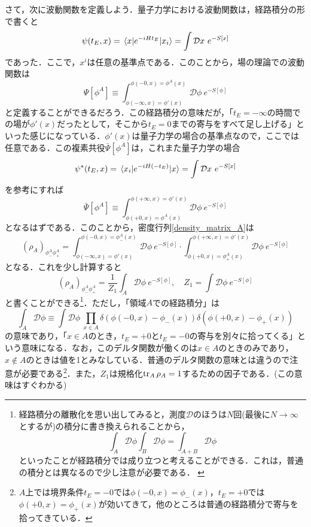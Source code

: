 \documentclass[a4paper,uplatex,dvipdfmx]{jsarticle}
\theoremstyle{definition}
\begin{document}
さて，次に波動関数を定義しよう．量子力学における波動関数は，経路積分の形で書くと
\begin{equation}
  \psi(t_{E},x)
  =
  \ev*{x|e^{-iHt_{E}}|x_i}
  =
  \int
  \mathcal{D}x\ 
  e^{-S[x]}
\end{equation}
であった．ここで，$x^{i}$は任意の基準点である．このことから，場の理論での波動関数は
\begin{equation}
  \Psi[\phi^{A}]
  \equiv
  \int_{\phi(-\infty,x)=\phi'(x)}^{\phi(-0,x)=\phi^{A}(x)}\mathcal{D}\phi\ 
  e^{-S[\phi]}
\end{equation}
と定義することができるだろう．この経路積分の意味だが，「$t_{E}=-\infty$の時間での場が$\phi'(x)$だったとして，そこから$t_E=0$までの寄与をすべて足し上げる」といった感じになっている．$\phi'(x)$は量子力学の場合の基準点なので，ここでは任意である．この複素共役$\bar{\Psi}[\phi^{A}]$は，これまた量子力学の場合
\begin{equation}
  \psi^{*}(t_{E},x)
  =
  \ev*{x_i|e^{-iH(-t_{E})}|x}
  =
  \int
  \mathcal{D}x\ 
  e^{-S[x]}
\end{equation}
を参考にすれば
\begin{equation}
  \bar{\Psi}[\phi^{A}]
  \equiv
  \int_{\phi(+0,x)=\phi^{A}(x)}^{\phi(+\infty,x)=\phi'(x)}\mathcal{D}\phi\ 
  e^{-S[\phi]}
\end{equation}
となるはずである．このことから，密度行列\eqref{density_matrix_A}は
\begin{equation}
  (\rho_{A})_{\phi^{A}_{-}\phi^{A}_{+}}
  =
  \int_{\phi(-\infty,x)=\phi'(x)}^{\phi(-0,x)=\phi_{-}^{A}(x)}\mathcal{D}\phi\ 
  e^{-S[\phi]}
  \cdot
  \int_{\phi(+0,x)=\phi_{+}^{A}(x)}^{\phi(+\infty,x)=\phi'(x)}\mathcal{D}\phi\ 
  e^{-S[\phi]}
  \label{dens1}
\end{equation}
となる．これを少し計算すると
\begin{equation}
  (\rho_{A})_{\phi^{A}_{-}\phi^{A}_{+}}
  =
  \frac{1}{Z_1}
  \int_{A}\mathcal{D}\phi\ 
  e^{-S[\phi]}
  ,\quad
  Z_{1}
  =
  \int\mathcal{D}\phi\ 
  e^{-S[\phi]}
\end{equation}
と書くことができる\footnote{
  経路積分の離散化を思い出してみると，測度$\mathcal{D}$のほうは$N$回(最後に$N\rightarrow\infty$とするが)の積分に書き換えられることから，
  $$
    \int_{A}\mathcal{D}\phi
    \int_{B}\mathcal{D}\phi
    =
    \int_{A+B}\mathcal{D}\phi
  $$
  といったことが経路積分では成り立つと考えることができる．これは，普通の積分とは異なるので少し注意が必要である．
  \label{footnote_path}
}．ただし，「領域$A$での経路積分」は
\begin{equation}  
  \int_{A}\mathcal{D}\phi
  \equiv
  \int\mathcal{D}\phi\ 
  \prod_{x\in A}
  \delta(\phi(-0,x)-\phi_{-}(x))
  \delta(\phi(+0,x)-\phi_{+}(x))
  \label{path_int_A}
\end{equation}
の意味であり，「$x\in A$のとき，$t_{E}=+0$と$t_{E}=-0$の寄与を別々に拾ってくる」という意味になる．なお，このデルタ関数が働くのは$x\in A$のときのみであり，$x\notin A$のときは値を1とみなしている．普通のデルタ関数の意味とは違うので注意が必要である\footnote{
  $A$上では境界条件$t_{E}=-0$では$\phi(-0,x)=\phi_{-}(x)$，$t_{E}=+0$では$\phi(+0,x)=\phi_{+}(x)$が効いてきて，他のところは普通の経路積分で寄与を拾ってきている．
}．また，$Z_1$は規格化$\tr_{A}\rho_{A}=1$するための因子である．(この意味はすぐわかる)
\end{document}
